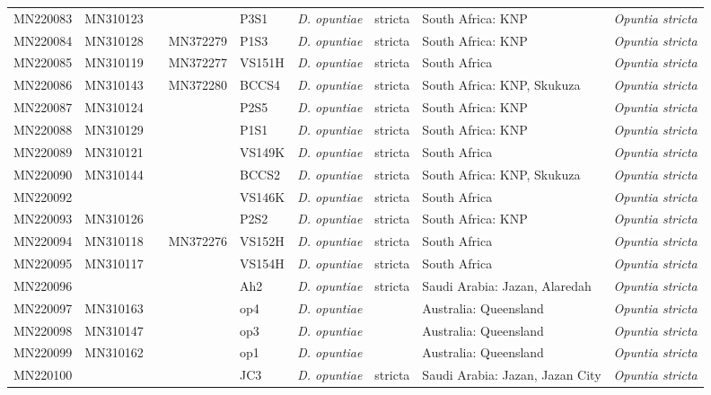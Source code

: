 \begin{landscape}
{\begin{longtable}{@{}lllllp{2.7cm}p{2.2cm}p{5cm}p{4cm}@{}}
MN220083 & MN310123 &  &  & P3S1 & \textit{D. opuntiae} & stricta & South Africa: KNP & \textit{Opuntia stricta} \\
MN220084 & MN310128 &  & MN372279 & P1S3 & \textit{D. opuntiae} & stricta & South Africa: KNP & \textit{Opuntia stricta} \\
MN220085 & MN310119 &  & MN372277 & VS151H & \textit{D. opuntiae} & stricta & South Africa & \textit{Opuntia stricta} \\
MN220086 & MN310143 &  & MN372280 & BCCS4 & \textit{D. opuntiae} & stricta & South Africa: KNP, Skukuza & \textit{Opuntia stricta} \\
MN220087 & MN310124 &  &  & P2S5 & \textit{D. opuntiae} & stricta & South Africa: KNP & \textit{Opuntia stricta} \\
MN220088 & MN310129 &  &  & P1S1 & \textit{D. opuntiae} & stricta & South Africa: KNP & \textit{Opuntia stricta} \\
MN220089 & MN310121 &  &  & VS149K & \textit{D. opuntiae} & stricta & South Africa & \textit{Opuntia stricta} \\
MN220090 & MN310144 &  &  & BCCS2 & \textit{D. opuntiae} & stricta & South Africa: KNP, Skukuza & \textit{Opuntia stricta} \\
MN220092 &  &  &  & VS146K & \textit{D. opuntiae} & stricta & South Africa & \textit{Opuntia stricta} \\
MN220093 & MN310126 &  &  & P2S2 & \textit{D. opuntiae} & stricta & South Africa: KNP & \textit{Opuntia stricta} \\
MN220094 & MN310118 &  & MN372276 & VS152H & \textit{D. opuntiae} & stricta & South Africa & \textit{Opuntia stricta} \\
MN220095 & MN310117 &  &  & VS154H & \textit{D. opuntiae} & stricta & South Africa & \textit{Opuntia stricta} \\
MN220096 &  &  &  & Ah2 & \textit{D. opuntiae} & stricta & Saudi Arabia: Jazan, Alaredah & \textit{Opuntia stricta} \\
MN220097 & MN310163 &  &  & op4 & \textit{D. opuntiae} &  & Australia: Queensland & \textit{Opuntia stricta} \\
MN220098 & MN310147 &  &  & op3 & \textit{D. opuntiae} &  & Australia: Queensland & \textit{Opuntia stricta} \\
MN220099 & MN310162 &  &  & op1 & \textit{D. opuntiae} &  & Australia: Queensland & \textit{Opuntia stricta} \\
MN220100 &  &  &  & JC3 & \textit{D. opuntiae} & stricta & Saudi Arabia: Jazan, Jazan City & \textit{Opuntia stricta} \\

\end{longtable}}
\end{landscape}

